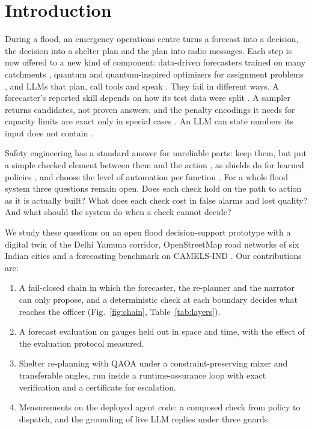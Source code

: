 \documentclass[conference]{IEEEtran}
\begin{document}
\section{Introduction}
During a flood, an emergency operations centre turns a forecast into a decision, the decision into a shelter plan and the plan into radio messages. Each step is now offered to a new kind of component: data-driven forecasters trained on many catchments \cite{Kratzert2019a,Nearing2024}, quantum and quantum-inspired optimizers for assignment problems \cite{Lucas2014,Abbas2024,Cadelina2024}, and LLMs that plan, call tools and speak \cite{Yao2023}. They fail in different ways. A forecaster's reported skill depends on how its test data were split \cite{Kapoor2023,Roberts2017}. A sampler returns candidates, not proven answers, and the penalty encodings it needs for capacity limits are exact only in special cases \cite{Glover2019}. An LLM can state numbers its input does not contain \cite{Ji2023}.

Safety engineering has a standard answer for unreliable parts: keep them, but put a simple checked element between them and the action \cite{Sha2001,Desai2019}, as shields do for learned policies \cite{Alshiekh2018}, and choose the level of automation per function \cite{Parasuraman2000}. For a whole flood system three questions remain open. Does each check hold on the path to action as it is actually built? What does each check cost in false alarms and lost quality? And what should the system do when a check cannot decide?

We study these questions on an open flood decision-support prototype with a digital twin of the Delhi Yamuna corridor, OpenStreetMap road networks of six Indian cities and a forecasting benchmark on CAMELS-IND \cite{Mangukiya2025}. Our contributions are:
\begin{enumerate}
\item A fail-closed chain in which the forecaster, the re-planner and the narrator can only propose, and a deterministic check at each boundary decides what reaches the officer (Fig.~\ref{fig:chain}, Table~\ref{tab:layers}).
\item A forecast evaluation on gauges held out in space and time, with the effect of the evaluation protocol measured.
\item Shelter re-planning with QAOA under a constraint-preserving mixer and transferable angles, run inside a runtime-assurance loop with exact verification and a certificate for escalation.
\item Measurements on the deployed agent code: a composed check from policy to dispatch, and the grounding of live LLM replies under three guards.
\end{enumerate}
\end{document}
